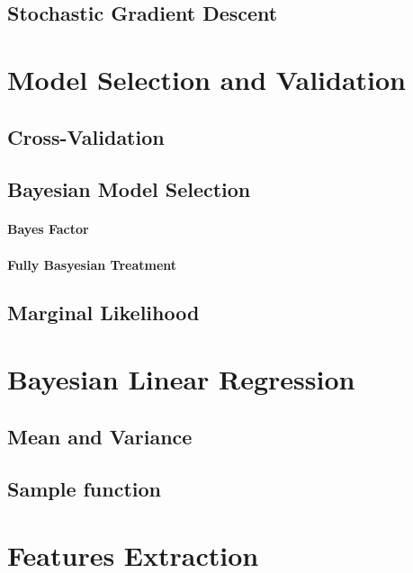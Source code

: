 	\subsection{Stochastic Gradient Descent}


\section{Model Selection and Validation}

	\subsection{Cross-Validation}

	\subsection{Bayesian Model Selection}
		\paragraph*{Bayes Factor}

		\paragraph*{Fully Basyesian Treatment}

	\subsection{Marginal Likelihood}

\section{Bayesian Linear Regression}

	\subsection{Mean and Variance}

	\subsection{Sample function}

\section{Features Extraction}

